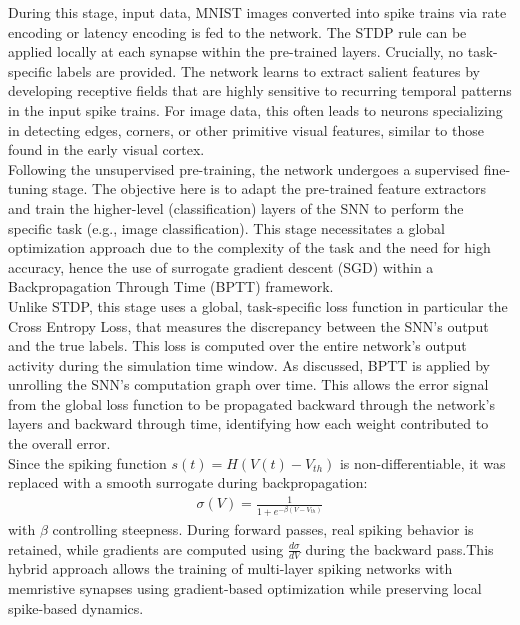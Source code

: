 \noindent During this stage, input data, MNIST images converted into spike trains via rate encoding or latency encoding is fed to the network. The STDP rule can be applied locally at each synapse within the pre-trained layers. Crucially, no task-specific labels are provided. The network learns to extract salient features by developing receptive fields that are highly sensitive to recurring temporal patterns in the input spike trains. For image data, this often leads to neurons specializing in detecting edges, corners, or other primitive visual features, similar to those found in the early visual cortex.\\

\noindent Following the unsupervised pre-training, the network undergoes a supervised fine-tuning stage. The objective here is to adapt the pre-trained feature extractors and train the higher-level (classification) layers of the SNN to perform the specific task (e.g., image classification). This stage necessitates a global optimization approach due to the complexity of the task and the need for high accuracy, hence the use of surrogate gradient descent (SGD) within a Backpropagation Through Time (BPTT) framework.\\

\noindent Unlike STDP, this stage uses a global, task-specific loss function in particular the Cross Entropy Loss, that measures the discrepancy between the SNN's output and the true labels. This loss is computed over the entire network's output activity during the simulation time window. As discussed, BPTT is applied by unrolling the SNN's computation graph over time. This allows the error signal from the global loss function to be propagated backward through the network's layers and backward through time, identifying how each weight contributed to the overall error.\\ 

\noindent Since the spiking function $s(t) = H(V(t) - V_{th})$ is non-differentiable, it was replaced with a smooth surrogate during backpropagation:
\begin{align}
    \sigma(V) = \frac{1}{1 + e^{-\beta(V - V_{th})}} \label{eq:6.41}
\end{align}
with $\beta$ controlling steepness. During forward passes, real spiking behavior is retained, while gradients are computed using $\frac{d\sigma}{dV}$ during the backward pass.This hybrid approach allows the training of multi-layer spiking networks with memristive synapses using gradient-based optimization while preserving local spike-based dynamics.\\

